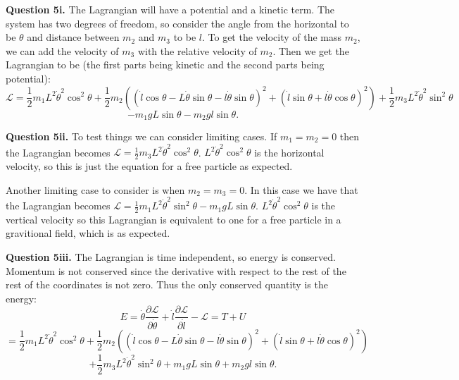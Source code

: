 \documentclass[letterpaper, reqno,11pt]{article}
\begin{document}
{\noindent\bf Question 5i.} The Lagrangian will have a potential and a kinetic term. The system has two degrees of freedom, so consider the angle from the horizontal to be $\theta$ and distance between $ m_2$ and $ m_3$ to be $l$. To get the velocity of the mass $m_2$, we can add the velocity of $ m_3$ with the relative velocity of $ m_2$. Then we get the Lagrangian to be (the first parts being kinetic and the second parts being potential): 
\[
\mathcal L=\frac{1}{2}m_1L^2\dot\theta^2\cos^2\theta+\frac{1}{2}m_2((\dot l\cos\theta-L\dot\theta\sin\theta-l\dot\theta\sin\theta)^2+(\dot l\sin\theta+l\dot\theta\cos\theta)^2)+\frac{1}{2}m_3L^2\dot\theta^2\sin^2\theta
\]
\[
-m_1gL\sin\theta-m_2gl\sin\theta
.\]

{\noindent\bf Question 5ii.} To test things we can consider limiting cases. If $ m_1=m_2=0$ then the Lagrangian becomes $\mathcal L=\frac{1}{2}m_3L^2\dot\theta^2\cos^2\theta$. $L^2\dot\theta^2\cos^2\theta$ is the horizontal velocity, so this is just the equation for a free particle as expected. 

Another limiting case to consider is when $ m_2=m_3=0$. In this case we have that the Lagrangian becomes $\mathcal L=\frac{1}{2}m_1L^2\dot\theta^2\sin^2\theta-m_1gL\sin\theta$. $L^2\dot\theta^2\cos^2\theta$ is the vertical velocity so this Lagrangian is equivalent to one for a free particle in a gravitional field, which is as expected. 

{\noindent\bf Question 5iii.} The Lagrangian is time independent, so energy is conserved. Momentum is not conserved since the derivative with respect to the rest of the rest of the coordinates is not zero. Thus the only conserved quantity is the energy: 
\[
E=\dot \theta\frac{\partial\mathcal L}{\partial \dot \theta}+\dot l\frac{\partial\mathcal L}{\partial \dot l}-\mathcal L=T+U
\]
\[
=\frac{1}{2}m_1L^2\dot\theta^2\cos^2\theta+\frac{1}{2}m_2((\dot l\cos\theta-L\dot\theta\sin\theta-l\dot\theta\sin\theta)^2+(\dot l\sin\theta+l\dot\theta\cos\theta)^2)
\]
\[
+\frac{1}{2}m_3L^2\dot\theta^2\sin^2\theta+m_1gL\sin\theta+m_2gl\sin\theta
.\]
\end{document}
